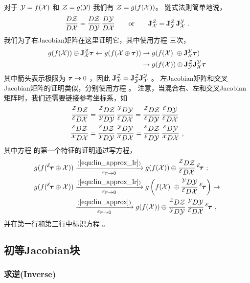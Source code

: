 对于 $\mathcal{Y}=f(\mathcal{X})$ 和 $\mathcal{Z}=g(\mathcal{Y})$ 我们有 $\mathcal{Z}=g(f(\mathcal{X}))$。
链式法则简单地说，
%
\begin{align}
\frac{D\mathcal{Z}}{D\mathcal{X}} = \frac{D\mathcal{Z}}{D\mathcal{Y}}\,\frac{D\mathcal{Y}}{D\mathcal{X}}
\qquad \textrm{or} \qquad
{{\bf J}^{\mathcal{Z}}_{\mathcal{X}}} = {{\bf J}^{\mathcal{Z}}_{\mathcal{Y}}}\,{{\bf J}^{\mathcal{Y}}_{\mathcal{X}}}
~.
\end{align}
%
我们为了右Jacobian矩阵在这里证明它，其中使用方程  三次，
%
\begin{align*}
g(f(\mathcal{X}))\oplus{{\bf J}^{\mathcal{Z}}_{\mathcal{X}}}{\bm \tau} \gets g(f(\mathcal{X}\oplus{\bm \tau})) &\to g(f(\mathcal{X})~\oplus{{\bf J}^{\mathcal{Y}}_{\mathcal{X}}}{\bm \tau}) 
  \\
  &\to g(f(\mathcal{X}))\oplus{{\bf J}^{\mathcal{Z}}_{\mathcal{Y}}}{{\bf J}^{\mathcal{Y}}_{\mathcal{X}}}{\bm \tau}
\end{align*}
%
其中箭头表示极限为 ${\bm \tau}\to0$ ，因此 ${{\bf J}^{\mathcal{Z}}_{\mathcal{X}}}={{\bf J}^{\mathcal{Z}}_{\mathcal{Y}}}{{\bf J}^{\mathcal{Y}}_{\mathcal{X}}}$ 。
左Jacobian矩阵和交叉Jacobian矩阵的证明类似，分别使用方程  。
%
注意，当混合右、左和交叉Jacobian矩阵时，我们还需要链接参考坐标系，如
%
\begin{align}
\rldpar{\cZ}{\cX}
  &= \rrdpar{\cZ}{\cY}\,\rldpar{\cY}{\cX}
  = \rldpar{\cZ}{\cY}\,\lldpar{\cY}{\cX} \label{equ:chain_rule_cross_1}
\\
\lrdpar{\cZ}{\cX}
  &= \lrdpar{\cZ}{\cY}\,\rrdpar{\cY}{\cX}
  = \lldpar{\cZ}{\cY}\,\lrdpar{\cY}{\cX}\label{equ:chain_rule_cross_2}
~,
\end{align}
%
其中方程  的第一个特征的证明通过写方程，
%
\begin{align*}
g(f({^\cE\!\bftau}\op\cX)) 
  &\xrightarrow[{^\cE\!\bftau}\to0]{\eqRef{equ:lin_approx_lr}} 
  g(f(\cX))\op\rldpar{\cZ}{\cX}\,{^\cE}\!\bftau
  ~; \\ 
g(f({^\cE\!\bftau}\op\cX)) 
  &\xrightarrow[{^\cE\!\bftau}\to0]{\eqRef{equ:lin_approx_lr}} 
  g\left(f(\cX)~\op\rldpar{\cY}{\cX}\,{^\cE}\!\bftau\right) \to
  \\
  &\xrightarrow[{^\cE\!\bftau}\to0]{\eqRef{equ:lin_approx}} 
  g(f(\cX))\op\rrdpar{\cZ}{\cY}\,\rldpar{\cY}{\cX}\,{^\cE}\!\bftau 
~,
\end{align*}
%
并在第一行和第三行中标识方程  。


\subsection{初等Jacobian块}
\label{sec:jacs_elementary}

\subsubsection{求逆(Inverse)}
\label{sec:Jac_inversion}

